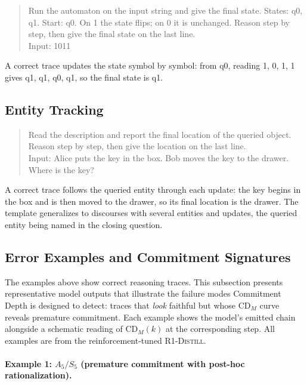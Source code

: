 \documentclass[11pt]{article}
\newcommand{\CDM}{\mathrm{CD}_{M}}
\newcommand{\stepk}{k}
\newcommand{\Rdistill}{\textsc{R1-Distill}}
\begin{document}
\begin{quote}\small\ttfamily
Run the automaton on the input string and give the final state. States: q0, q1.
Start: q0. On 1 the state flips; on 0 it is unchanged. Reason step by step, then
give the final state on the last line.\\[2pt]
Input: 1011
\end{quote}

\noindent A correct trace updates the state symbol by symbol: from q0, reading
1, 0, 1, 1 gives q1, q1, q0, q1, so the final state is q1.

\subsection{Entity Tracking}
\label{app:prompts-entity}

\begin{quote}\small\ttfamily
Read the description and report the final location of the queried object. Reason
step by step, then give the location on the last line.\\[2pt]
Input: Alice puts the key in the box. Bob moves the key to the drawer. Where is
the key?
\end{quote}

\noindent A correct trace follows the queried entity through each update: the
key begins in the box and is then moved to the drawer, so its final location is
the drawer. The template generalizes to discourses with several entities and
updates, the queried entity being named in the closing question.

\subsection{Error Examples and Commitment Signatures}
\label{app:prompts-errors}

The examples above show correct reasoning traces. This subsection presents
representative model outputs that illustrate the failure modes Commitment Depth
is designed to detect: traces that \emph{look} faithful but whose $\CDM$ curve
reveals premature commitment. Each example shows the model's emitted chain
alongside a schematic reading of $\CDM(\stepk)$ at the corresponding step.
All examples are from the reinforcement-tuned \Rdistill.

\paragraph{Example 1: $A_5/S_5$ (premature commitment with post-hoc
rationalization).}
\end{document}
